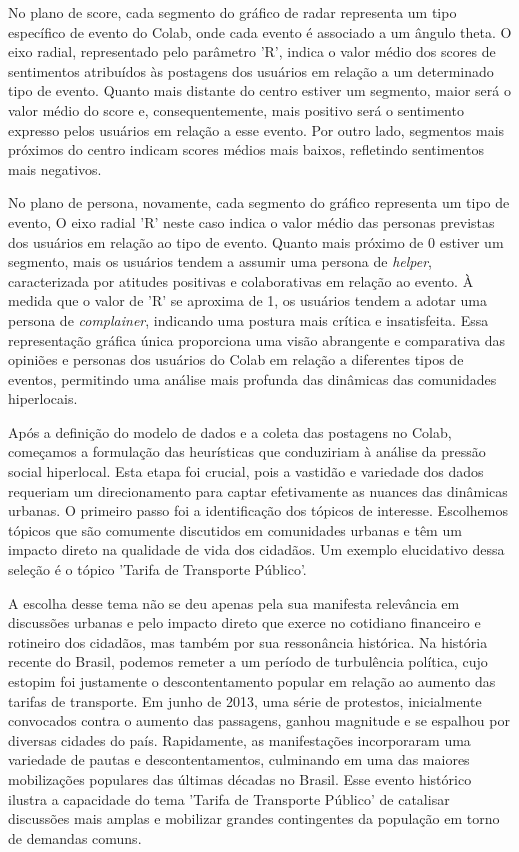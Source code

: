 No plano de score, cada segmento do gráfico de radar representa um tipo específico de evento do Colab, onde cada evento é associado a um ângulo theta. O eixo radial, representado pelo parâmetro 'R', indica o valor médio dos scores de sentimentos atribuídos às postagens dos usuários em relação a um determinado tipo de evento. Quanto mais distante do centro estiver um segmento, maior será o valor médio do score e, consequentemente, mais positivo será o sentimento expresso pelos usuários em relação a esse evento. Por outro lado, segmentos mais próximos do centro indicam scores médios mais baixos, refletindo sentimentos mais negativos.

No plano de persona, novamente, cada segmento do gráfico representa um tipo de evento, O eixo radial 'R' neste caso indica o valor médio das personas previstas dos usuários em relação ao tipo de evento. Quanto mais próximo de 0 estiver um segmento, mais os usuários tendem a assumir uma persona de \textit{helper}, caracterizada por atitudes positivas e colaborativas em relação ao evento. À medida que o valor de 'R' se aproxima de 1, os usuários tendem a adotar uma persona de \textit{complainer}, indicando uma postura mais crítica e insatisfeita. Essa representação gráfica única proporciona uma visão abrangente e comparativa das opiniões e personas dos usuários do Colab em relação a diferentes tipos de eventos, permitindo uma análise mais profunda das dinâmicas das comunidades hiperlocais.

Após a definição do modelo de dados e a coleta das postagens no Colab, começamos a formulação das heurísticas que conduziriam à análise da pressão social hiperlocal. Esta etapa foi crucial, pois a vastidão e variedade dos dados requeriam um direcionamento para captar efetivamente as nuances das dinâmicas urbanas. O primeiro passo foi a identificação dos tópicos de interesse. Escolhemos tópicos que são comumente discutidos em comunidades urbanas e têm um impacto direto na qualidade de vida dos cidadãos. Um exemplo elucidativo dessa seleção é o tópico 'Tarifa de Transporte Público'. 

A escolha desse tema não se deu apenas pela sua manifesta relevância em discussões urbanas e pelo impacto direto que exerce no cotidiano financeiro e rotineiro dos cidadãos, mas também por sua ressonância histórica. Na história recente do Brasil, podemos remeter a um período de turbulência política, cujo estopim foi justamente o descontentamento popular em relação ao aumento das tarifas de transporte. Em junho de 2013, uma série de protestos, inicialmente convocados contra o aumento das passagens, ganhou magnitude e se espalhou por diversas cidades do país. Rapidamente, as manifestações incorporaram uma variedade de pautas e descontentamentos, culminando em uma das maiores mobilizações populares das últimas décadas no Brasil. Esse evento histórico ilustra a capacidade do tema 'Tarifa de Transporte Público' de catalisar discussões mais amplas e mobilizar grandes contingentes da população em torno de demandas comuns.

